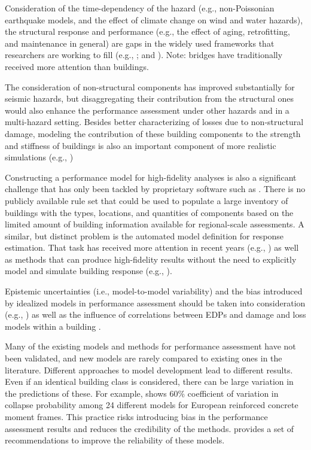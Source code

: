 Consideration of the time-dependency of the hazard (e.g., non-Poissonian earthquake models, and the effect of climate change on wind and water hazards), the structural response and performance (e.g., the effect of aging, retrofitting, and maintenance in general) are gaps in the widely used frameworks that researchers are working to fill (e.g., \cite{gavrilovic2020multi, choe2008probabilistic}; and \cite{pitilakis2014consideration}). Note: bridges have traditionally received more attention than buildings.

The consideration of non-structural components has improved substantially for seismic hazards, but disaggregating their contribution from the structural ones would also enhance the performance assessment under other hazards and in a multi-hazard setting. Besides better characterizing of losses due to non-structural damage, modeling the contribution of these building components to the strength and stiffness of buildings is also an important component of more realistic simulations (e.g., \cite{filiatrault2014performance, welch2016nonstructural})

Constructing a performance model for high-fidelity analyses is also a significant challenge that has only been tackled by proprietary software such as . There is no publicly available rule set that could be used to populate a large inventory of buildings with the types, locations, and quantities of components based on the limited amount of building information available for regional-scale assessments. A similar, but distinct problem is the automated model definition for response estimation. That task has received more attention in recent years (e.g., \cite{guan2020python, xiong2016nonlinear}) as well as methods that can produce high-fidelity results without the need to explicitly model and simulate building response (e.g., \cite{zou2020surrogate}).

Epistemic uncertainties (i.e., model-to-model variability) and the bias introduced by idealized models in performance assessment should be taken into consideration (e.g., \cite{aslani2005probability, schotanus2004seismic}) as well as the influence of correlations between EDPs \citep{shome2009comparison} and damage and loss models within a building \citep{ramirez2009building}.

Many of the existing models and methods for performance assessment have not been validated, and new models are rarely compared to existing ones in the literature. Different approaches to model development lead to different results. Even if an identical building class is considered, there can be large variation in the predictions of these. For example, \citet{crowley2014epistemic} shows 60\% coefficient of variation in collapse probability among 24 different models for European reinforced concrete moment frames. This practice risks introducing bias in the performance assessment results and reduces the credibility of the methods. \citet{silva2019current} provides a set of recommendations to improve the reliability of these models.

